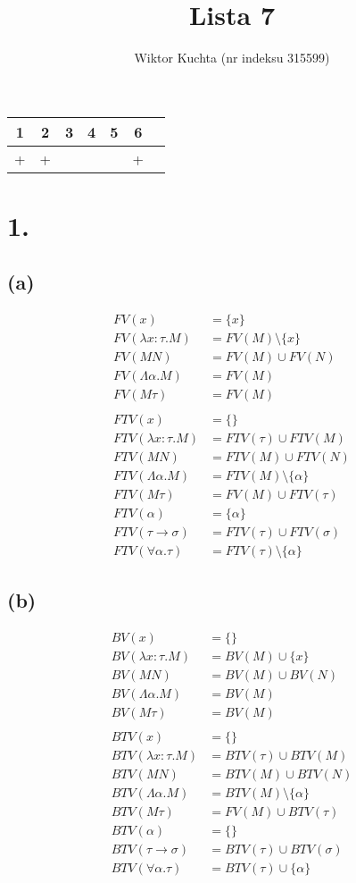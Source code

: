 \documentclass[a4paper, 12pt]{article}
\title{Lista 7}
\author{Wiktor Kuchta (nr indeksu 315599)}
\newcommand{\+}{\enspace}
\begin{document}
\maketitle

\begin{center}
	\begin{tabular}{ |*{7}{c|} }
	\hline
	1 & 2 & 3 & 4 & 5 & 6 \\
	\hline
	+ & + &   &   &   & + \\
	\hline
\end{tabular}
\end{center}

\section*{1.}

\subsection*{(a)}
\begin{align*}
	FV(x) &= \{ x \} \\
	FV(λx:τ.M) &= FV(M) \setminus \{ x \} \\
	FV(MN) &= FV(M) ∪ FV(N) \\
	FV(Λα.M) &= FV(M) \\
	FV(Mτ) &= FV(M) \\ %
	\\
	FTV(x) &= \{ \} \\
	FTV(λx:τ.M) &= FTV(τ) ∪ FTV(M) \\
	FTV(MN) &= FTV(M) ∪ FTV(N) \\
	FTV(Λα.M) &= FTV(M) \setminus \{ α \} \\
	FTV(Mτ) &= FV(M) ∪ FTV(τ) \\
	FTV(α) &= \{ α \} \\
	FTV(τ → σ) &= FTV(τ) ∪ FTV(σ) \\
	FTV(∀α.τ) &= FTV(τ) \setminus \{ α \}
\end{align*}

\subsection*{(b)}
\begin{align*}
	BV(x) &= \{ \} \\
	BV(λx:τ.M) &= BV(M) ∪ \{ x \}  \\
	BV(MN) &= BV(M) ∪ BV(N) \\
	BV(Λα.M) &= BV(M) \\
	BV(Mτ) &= BV(M) \\ %
	\\
	BTV(x) &= \{ \} \\
	BTV(λx:τ.M) &= BTV(τ) ∪ BTV(M) \\
	BTV(MN) &= BTV(M) ∪ BTV(N) \\
	BTV(Λα.M) &= BTV(M) \setminus \{ α \} \\
	BTV(Mτ) &= FV(M) ∪ BTV(τ) \\ %
	BTV(α) &= \{ \} \\
	BTV(τ → σ) &= BTV(τ) ∪ BTV(σ) \\
	BTV(∀α.τ) &= BTV(τ) ∪ \{ α \}
\end{align*}
\end{document}
